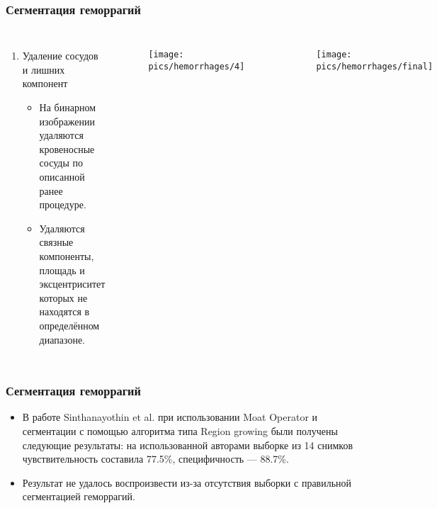 \documentclass{beamer}
\begin{document}
\begin{frame}
	\frametitle{Сегментация геморрагий}
	
	\begin{columns}[c]
		
		\begin{enumerate}
			\footnotesize
			\setcounter{enumi}{1}
			\item Удаление сосудов и лишних компонент
			\begin{itemize}
				\item На бинарном изображении удаляются кровеносные сосуды по описанной ранее процедуре.
				\vspace{2cm}
				\item Удаляются связные компоненты, площадь и эксцентриситет которых не находятся в определённом диапазоне.
				\normalsize
			\end{itemize}
		\end{enumerate}
			\begin{figure}
			\centering
			\texttt{[image: pics/hemorrhages/4]}
			\label{fig:4}
			\end{figure}
			\vspace*{-0.8cm}
			\begin{figure}
			\centering
			\texttt{[image: pics/hemorrhages/final]}
			\label{fig:final}
\end{figure}
	\end{columns}
\end{frame}


\begin{frame}
	\frametitle{Сегментация геморрагий}
	
	\begin{itemize}
		\item В работе Sinthanayothin et al. при использовании Moat Operator и сегментации с помощью алгоритма типа Region growing были получены следующие результаты: на использованной авторами выборке из 14 снимков чувствительность составила 77.5\%, специфичность --- 88.7\%.
		\item Результат не удалось воспроизвести из-за отсутствия выборки с правильной сегментацией геморрагий.
	\end{itemize}
\end{frame}

\end{document}
